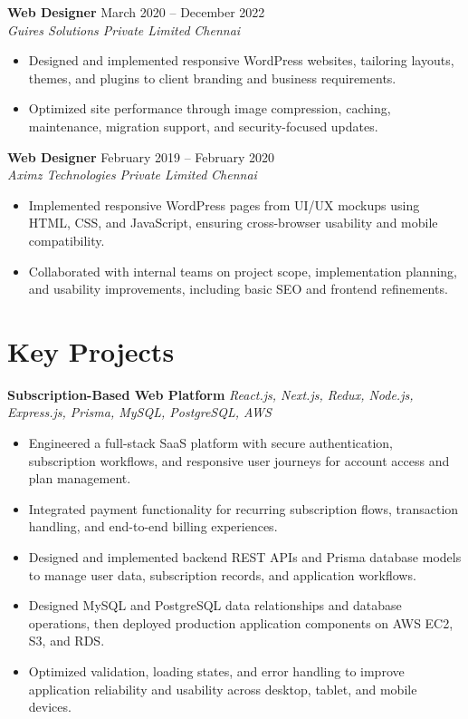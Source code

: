 \documentclass[12pt,a4paper]{article}
\newcommand{\resumeSubheading}[4]{
  \vspace{2pt}
  \textbf{#1} \hfill #2 \\
  \textit{#3} \hfill \textit{#4} \\
}
\newcommand{\resumeProjectHeading}[2]{
  \vspace{2pt}
  \textbf{#1} \hfill \textit{#2} \\
}
\begin{document}
\resumeSubheading{Web Designer}{March 2020 -- December 2022}{Guires Solutions Private Limited}{Chennai}
\begin{itemize}[leftmargin=1.2em,itemsep=4pt,topsep=4pt]
    \item Designed and implemented responsive WordPress websites, tailoring layouts, themes, and plugins to client branding and business requirements.
    \item Optimized site performance through image compression, caching, maintenance, migration support, and security-focused updates.
\end{itemize}

\resumeSubheading{Web Designer}{February 2019 -- February 2020}{Aximz Technologies Private Limited}{Chennai}
\begin{itemize}[leftmargin=1.2em,itemsep=4pt,topsep=4pt]
    \item Implemented responsive WordPress pages from UI/UX mockups using HTML, CSS, and JavaScript, ensuring cross-browser usability and mobile compatibility.
    \item Collaborated with internal teams on project scope, implementation planning, and usability improvements, including basic SEO and frontend refinements.
\end{itemize}

\section*{Key Projects}
\resumeProjectHeading{Subscription-Based Web Platform}{React.js, Next.js, Redux, Node.js, Express.js, Prisma, MySQL, PostgreSQL, AWS}
\begin{itemize}[leftmargin=1.2em,itemsep=4pt,topsep=4pt]
    \item Engineered a full-stack SaaS platform with secure authentication, subscription workflows, and responsive user journeys for account access and plan management.
    \item Integrated payment functionality for recurring subscription flows, transaction handling, and end-to-end billing experiences.
    \item Designed and implemented backend REST APIs and Prisma database models to manage user data, subscription records, and application workflows.
    \item Designed MySQL and PostgreSQL data relationships and database operations, then deployed production application components on AWS EC2, S3, and RDS.
    \item Optimized validation, loading states, and error handling to improve application reliability and usability across desktop, tablet, and mobile devices.
\end{itemize}
\end{document}
